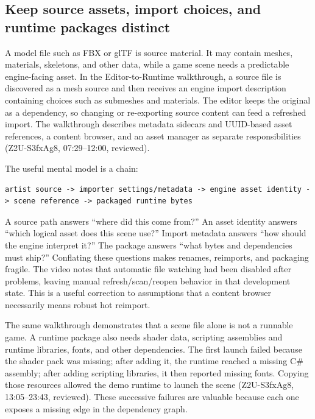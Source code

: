 \subsection{Keep source assets, import choices, and runtime packages distinct}\label{06-engine-ii-ch032-keep-source-assets-import-choices-and-runtime-packages-distinct}

A model file such as FBX or glTF is source material. It may contain meshes, materials, skeletons, and other data, while a game scene needs a predictable engine-facing asset. In the Editor-to-Runtime walkthrough, a source file is discovered as a mesh source and then receives an engine import description containing choices such as submeshes and materials. The editor keeps the original as a dependency, so changing or re-exporting source content can feed a refreshed import. The walkthrough describes metadata sidecars and UUID-based asset references, a content browser, and an asset manager as separate responsibilities (Z2U-S3fxAg8, 07:29--12:00, reviewed).

The useful mental model is a chain:

\begin{verbatim}
artist source -> importer settings/metadata -> engine asset identity -> scene reference -> packaged runtime bytes
\end{verbatim}

A source path answers ``where did this come from?'' An asset identity answers ``which logical asset does this scene use?'' Import metadata answers ``how should the engine interpret it?'' The package answers ``what bytes and dependencies must ship?'' Conflating these questions makes renames, reimports, and packaging fragile. The video notes that automatic file watching had been disabled after problems, leaving manual refresh/scan/reopen behavior in that development state. This is a useful correction to assumptions that a content browser necessarily means robust hot reimport.

The same walkthrough demonstrates that a scene file alone is not a runnable game. A runtime package also needs shader data, scripting assemblies and runtime libraries, fonts, and other dependencies. The first launch failed because the shader pack was missing; after adding it, the runtime reached a missing C\# assembly; after adding scripting libraries, it then reported missing fonts. Copying those resources allowed the demo runtime to launch the scene (Z2U-S3fxAg8, 13:05--23:43, reviewed). These successive failures are valuable because each one exposes a missing edge in the dependency graph.

